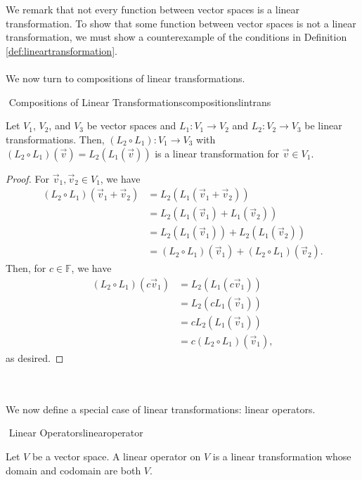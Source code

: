         \vphantom
        \\
        \\
        We remark that not every function between vector spaces is a linear transformation. To show that some function between vector spaces is not a linear transformation, we must show a counterexample of the conditions in Definition \ref{def:lineartransformation}.
        \pagebreak
        \\
        \\
        We now turn to compositions of linear transformations.
        \begin{theorem}{\Stop\,\,Compositions of Linear Transformations}{compositionslintrans}

            Let \(V_1\), \(V_2\), and \(V_3\) be vector spaces and \(L_1:V_1\to V_2\) and \(L_2:V_2\to V_3\) be linear transformations. Then, \((L_2\circ L_1):V_1\to V_3\) with \((L_2\circ L_1)(\vec{v})=L_2(L_1(\vec{v}))\) is a linear transformation for \(\vec{v}\in V_1\).
            \begin{proof}
                For \(\vec{v}_1,\vec{v}_2\in V_1\), we have
                \begin{align*}
                    (L_2\circ L_1)(\vec{v}_1+\vec{v}_2)&=L_2(L_1(\vec{v}_1+\vec{v}_2)) \\
                    &=L_2(L_1(\vec{v}_1)+L_1(\vec{v}_2)) \\
                    &=L_2(L_1(\vec{v}_1))+L_2(L_1(\vec{v}_2)) \\
                    &=(L_2\circ L_1)(\vec{v}_1)+(L_2\circ L_1)(\vec{v}_2).
                \end{align*}
                Then, for \(c\in\mathbb{F}\), we have
                \begin{align*}
                    (L_2\circ L_1)(c\vec{v}_1)&=L_2(L_1(c\vec{v}_1)) \\
                    &=L_2(cL_1(\vec{v}_1)) \\
                    &=cL_2(L_1(\vec{v}_1)) \\
                    &=c(L_2\circ L_1)(\vec{v}_1),
                \end{align*}
                as desired.
            \end{proof}            
        \end{theorem}
        \vphantom
        \\
        \\
        We now define a special case of linear transformations: linear operators.
        \begin{definition}{\Stop\,\,Linear Operators}{linearoperator}

            Let \(V\) be a vector space. A linear operator on \(V\) is a linear transformation whose domain and codomain are both \(V\).
            
        \end{definition}
